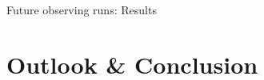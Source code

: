 \documentclass[usenames,dvipsnames,t]{beamer}
\begin{document}
\begin{frame}{Future observing runs: Results}
  \def\x{3mm}
  \def\y{2mm}

  \vspace{-4mm}
    \begin{table}[h]
      \centering
      
      \caption{$R_{1.4}$ [km] at 90\% credibility.} %
    \end{table}

  \vspace{-4mm}
  \pause
  
    \begin{table}[h]
      \centering
      
      \caption{Sampling time on 1 NVIDIA H100 GPU.}
    \end{table}
  

\end{frame}

\section{Outlook \& Conclusion}
\end{document}
